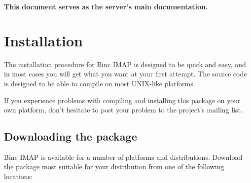 \documentclass[11pt,a4paper,twoside,openright]{report}
\begin{document}
\textbf{This document serves as the server's main documentation.}

\chapter[Installing Binc IMAP]{Installation}

The installation procedure for Binc IMAP is designed to be quick and
easy, and in most cases you will get what you want at your first
attempt. The source code is designed to be able to compile on most
UNIX-like platforms.

If you experience problems with compiling and installing this package
on your own platform, don't hesitate to post your problem to the
project's mailing list.

\section{Downloading the package}

Binc IMAP is available for a number of platforms and distributions.
Download the package most suitable for your distribution from one
of the following locations:
\end{document}
